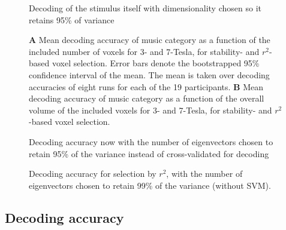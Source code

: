 \begin{figure}
  \centering
  \def\svgwidth{\linewidth}
  
	
  \caption{ Decoding of the stimulus itself with dimensionality chosen so it
  retains 95\% of variance }

 \label{fig:decoding_accuracy_stimulus}
\end{figure}

\begin{figure}
  \centering
  \def\svgwidth{\linewidth}
  
	
  \caption{\textbf{A} Mean decoding accuracy of music category as a function of
  the included number of voxels for 3- and 7-Tesla, for stability- and
  $r^2$-based voxel selection. Error bars denote the bootstrapped 95\%
  confidence interval of the mean. The mean is taken over decoding
  accuracies of eight runs for each of the 19 participants. \textbf{B} Mean
decoding accuracy of music category as a function of the overall volume of the
included voxels for 3- and 7-Tesla, for stability- and $r^2$-based voxel
selection.
}

 \label{fig:decoding_accuracy}
\end{figure}

\begin{figure}
  \centering
  \def\svgwidth{\linewidth}
  
	
  \caption{ Decoding accuracy now with the number of eigenvectors chosen to
  retain 95\% of the variance instead of cross-validated for decoding }

 \label{fig:decoding_accuracy_var95}
\end{figure}

\begin{figure}
  \centering
  \def\svgwidth{\linewidth}
  
	
  \caption{ Decoding accuracy for selection by $r^2$, with the number of eigenvectors chosen to
	  retain 99\% of the variance (without SVM). }

 \label{fig:decoding_accuracy_var99}
\end{figure}


\subsection*{Decoding accuracy}

